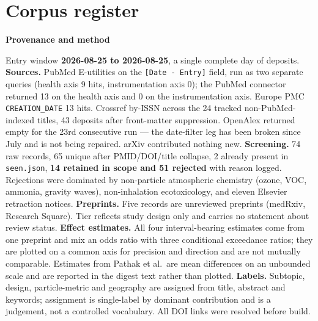 \documentclass[10pt]{article}
\begin{document}
\clearpage

\section*{\sffamily\bfseries\color{Deep}Corpus register}
\vspace{-1.5mm}{\color{Amber}\rule{\linewidth}{1.1pt}}\vspace{2.5mm}



\vspace{4mm}
\begin{keybox}
{\sffamily\bfseries\footnotesize\color{Deep}Provenance and method}\\[1.2mm]
{\fontsize{7.2}{8.8}\selectfont
Entry window \textbf{2026-08-25 to 2026-08-25}, a single complete day of deposits.
\textbf{Sources.} PubMed E-utilities on the \texttt{[Date - Entry]} field, run as two
separate queries (health axis 9 hits, instrumentation axis 0); the PubMed connector
returned 13 on the health axis and 0 on the instrumentation axis. Europe PMC
\texttt{CREATION\_DATE} 13 hits. Crossref by-ISSN across the 24 tracked
non-PubMed-indexed titles, 43 deposits after front-matter suppression. OpenAlex returned
empty for the 23rd consecutive run --- the date-filter leg has been broken since July and
is not being repaired. arXiv contributed nothing new.
\textbf{Screening.} 74 raw records, 65 unique after PMID/DOI/title collapse, 2 already
present in \texttt{seen.json}, \textbf{14 retained in scope and 51 rejected} with reason
logged. Rejections were dominated by non-particle atmospheric chemistry (ozone, VOC,
ammonia, gravity waves), non-inhalation ecotoxicology, and eleven Elsevier retraction
notices.
\textbf{Preprints.} Five records are unreviewed preprints (medRxiv, Research Square).
Tier reflects study design only and carries no statement about review status.
\textbf{Effect estimates.} All four interval-bearing estimates come from one preprint and
mix an odds ratio with three conditional exceedance ratios; they are plotted on a common
axis for precision and direction and are not mutually comparable. Estimates from
Pathak et al.\ are mean differences on an unbounded scale and are reported in the digest
text rather than plotted.
\textbf{Labels.} Subtopic, design, particle-metric and geography are assigned from title,
abstract and keywords; assignment is single-label by dominant contribution and is a
judgement, not a controlled vocabulary. All DOI links were resolved before build.\par}
\end{keybox}
\end{document}
